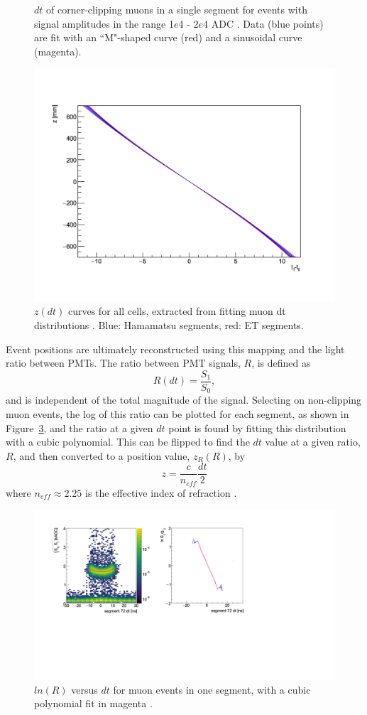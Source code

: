 \begin{figure}[h]
\begin{minipage}[h]{0.5\linewidth}
		\caption{$dt$ of corner-clipping muons in a single segment for events with signal amplitudes in the range  1$e$4 -  2$e$4 ADC \cite{MM:2314}. Data (blue points) are fit with an ``M"-shaped curve (red) and a sinusoidal curve (magenta).}
		\label{fig:hobbesfit}
	\end{minipage}
\end{figure}

\begin{figure}[H]
	\centering
	\includegraphics[width=0.45\linewidth]{tex/5-analysis-images/z_vs_dt}
	\caption{$z(dt)$ curves for all cells, extracted from fitting muon dt distributions \cite{MM:2314}. Blue: Hamamatsu segments, red: ET segments.}
	\label{fig:zvsdt}
\end{figure}

Event positions are ultimately reconstructed using this mapping and the light ratio between PMTs.  
The ratio between PMT signals, $R$, is defined as
\begin{equation}
	R(dt) = \frac{S_1}{S_0},
\end{equation}
and is independent of the total magnitude of the signal.
Selecting on non-clipping muon events, the log of this ratio can be plotted for each segment, as shown in Figure~\ref{fig:rvsdt}, and the ratio at a given $dt$ point is found by fitting this distribution with a cubic polynomial. 
This can be flipped to find the $dt$ value at a given ratio, $R$, and then converted to a position value, $z_R(R)$, by
\begin{equation}
	z = \frac{c}{n_{eff}}\frac{dt}{2}
	\label{eq:zdt}
\end{equation}
where $n_{eff} \approx 2.25$ is the effective index of refraction \cite{MM:2314}.

\begin{figure}[!b]
	\centering
	\includegraphics[width=0.5\linewidth]{tex/5-analysis-images/R_vs_dt}
	\caption{$ln(R)$ versus $dt$ for muon events in one segment, with a cubic polynomial fit in magenta \cite{MM:2314}.}
	\label{fig:rvsdt}
\end{figure}

